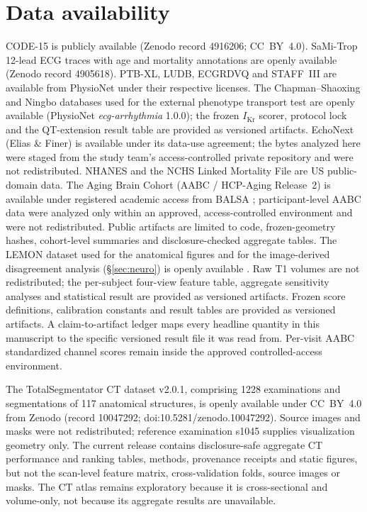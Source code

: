 \documentclass[11pt]{article}
\begin{document}
\section*{Data availability}
CODE-15 is publicly available (Zenodo record 4916206; CC~BY~4.0). SaMi-Trop 12-lead ECG
traces with age and mortality annotations are openly available (Zenodo record 4905618).
PTB-XL, LUDB, ECGRDVQ and STAFF~III are available from PhysioNet under their respective
licenses. The Chapman--Shaoxing and Ningbo databases used for the external phenotype
transport test are openly available (PhysioNet \emph{ecg-arrhythmia} 1.0.0); the frozen
$I_{\text{Kr}}$ scorer, protocol lock and the QT-extension result table are provided as
versioned artifacts. EchoNext (Elias \& Finer) is available under its data-use agreement; the bytes
analyzed here were staged from the study team's access-controlled private repository and
were not redistributed. NHANES and the NCHS Linked Mortality File are US public-domain
data. The Aging Brain Cohort (AABC / HCP-Aging Release~2) is available under
registered academic access from BALSA \citep{bookheimer2019,harms2018};
participant-level AABC data were analyzed only within an approved, access-controlled
environment and were not redistributed. Public artifacts are limited to code,
frozen-geometry hashes, cohort-level summaries and disclosure-checked aggregate tables.
The LEMON dataset used for the anatomical figures and for the image-derived
disagreement analysis (\S\ref{sec:neuro}) is openly available
\citep{babayan2019}. Raw T1 volumes are not redistributed; the per-subject four-view
feature table, aggregate sensitivity analyses and statistical result are provided as
versioned artifacts. Frozen score
definitions, calibration constants and result tables are provided as versioned artifacts.
A claim-to-artifact ledger maps every headline quantity in this manuscript to the specific
versioned result file it was read from. Per-visit AABC standardized channel scores remain
inside the approved controlled-access environment.

The TotalSegmentator CT dataset v2.0.1, comprising \num{1228} examinations and
segmentations of \num{117} anatomical structures, is openly available under CC~BY~4.0
from Zenodo (record 10047292; doi:10.5281/zenodo.10047292). Source images and masks were
not redistributed; reference examination s1045 supplies visualization geometry only.
The current release contains disclosure-safe aggregate CT performance and ranking tables,
methods, provenance receipts and static figures, but not the scan-level feature matrix,
cross-validation folds, source images or masks. The CT atlas remains exploratory because it
is cross-sectional and volume-only, not because its aggregate results are unavailable.
\end{document}
